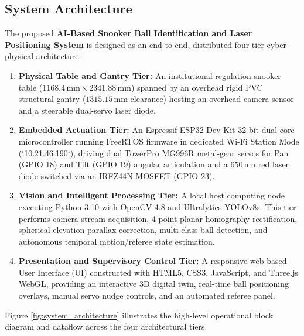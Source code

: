 \subsection{System Architecture}
The proposed \textbf{AI-Based Snooker Ball Identification and Laser Positioning System} is designed as an end-to-end, distributed four-tier cyber-physical architecture:
\begin{enumerate}
    \item \textbf{Physical Table and Gantry Tier:} An institutional regulation snooker table ($1168.4\,\text{mm} \times 2341.88\,\text{mm}$) spanned by an overhead rigid PVC structural gantry ($1315.15\,\text{mm}$ clearance) hosting an overhead camera sensor and a steerable dual-servo laser diode.
    \item \textbf{Embedded Actuation Tier:} An Espressif ESP32 Dev Kit 32-bit dual-core microcontroller running FreeRTOS firmware in dedicated Wi-Fi Station Mode (`10.21.46.190`), driving dual TowerPro MG996R metal-gear servos for Pan (GPIO 18) and Tilt (GPIO 19) angular articulation and a $650\,\text{nm}$ red laser diode switched via an IRFZ44N MOSFET (GPIO 23).
    \item \textbf{Vision and Intelligent Processing Tier:} A local host computing node executing Python 3.10 with OpenCV 4.8 and Ultralytics YOLOv8s. This tier performs camera stream acquisition, 4-point planar homography rectification, spherical elevation parallax correction, multi-class ball detection, and autonomous temporal motion/referee state estimation.
    \item \textbf{Presentation and Supervisory Control Tier:} A responsive web-based User Interface (UI) constructed with HTML5, CSS3, JavaScript, and Three.js WebGL, providing an interactive 3D digital twin, real-time ball positioning overlays, manual servo nudge controls, and an automated referee panel.
\end{enumerate}

Figure \ref{fig:system_architecture} illustrates the high-level operational block diagram and dataflow across the four architectural tiers.

